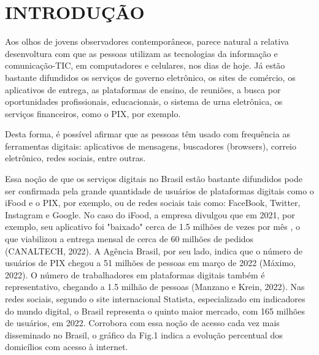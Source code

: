 
\incluirsumario%


\textual%


\chapter[INTRODUÇÃO]{INTRODUÇÃO}\label{INTRODUÇÃO}
Aos olhos de jovens observadores contemporâneos, parece natural a relativa desenvoltura com que as pessoas utilizam as tecnologias da informação e comunicação-TIC, em computadores e celulares, nos dias de hoje. Já estão bastante difundidos os serviços de governo eletrônico, os sites de comércio, os aplicativos de entrega, as plataformas de ensino, de reuniões, a busca por oportunidades profissionais, educacionais, o sistema de urna eletrônica, os serviços financeiros, como o PIX, por exemplo.

Desta forma, é possível afirmar que as pessoas têm usado com frequência  as ferramentas digitais: aplicativos de mensagens, buscadores (browsers), correio eletrônico, redes sociais, entre outras.

Essa noção de que os serviços digitais no Brasil estão bastante difundidos pode ser confirmada pela grande quantidade de usuários de plataformas digitais como o iFood e o PIX, por exemplo, ou de redes sociais tais como: FaceBook, Twitter, Instagram e Google. No caso do iFood, a empresa divulgou que em 2021, por exemplo, seu aplicativo foi "baixado" cerca de 1.5 milhões de vezes por mês , o que viabilizou a entrega mensal de cerca de 60 milhões de pedidos  (CANALTECH, 2022). A Agência Brasil, por seu lado, indica que o número de usuários de PIX chegou a 51 milhões de pessoas em março de 2022 (Máximo, 2022). O número de trabalhadores em plataformas digitais também é representativo, chegando a 1.5 milhão de pessoas  (Manzano e Krein, 2022). Nas redes sociais, segundo o site internacional Statista, especializado em indicadores do mundo digital, o Brasil representa o quinto maior mercado, com 165 milhões de usuários, em 2022. Corrobora com essa noção de acesso cada vez mais disseminado no Brasil, o gráfico da Fig.1 indica a evolução percentual dos domicílios com acesso à internet.




